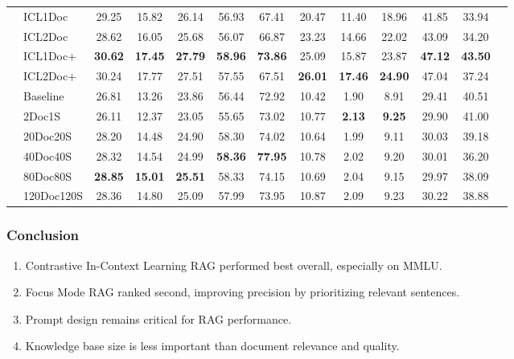 \documentclass[12pt, a4paper, oneside]{report}
\begin{document}
\begin{table}[H]
\begin{tabular}{llccccccccccc}
  & ICL1Doc  & 29.25 & 15.82 & 26.14 & 56.93 & 67.41 & 20.47 & 11.40 & 18.96 & 41.85 & 33.94 \\
  & ICL2Doc  & 28.62 & 16.05 & 25.68 & 56.07 & 66.87 & 23.23 & 14.66 & 22.02 & 43.09 & 34.20 \\
  & ICL1Doc+ & \textbf{30.62} & \textbf{17.45} & \textbf{27.79} & \textbf{58.96} & \textbf{73.86} & 25.09 & 15.87 & 23.87 & \textbf{47.12} & \textbf{43.50} \\
  & ICL2Doc+ & 30.24 & 17.77 & 27.51 & 57.55 & 67.51 & \textbf{26.01} & \textbf{17.46} & \textbf{24.90} & 47.04 & 37.24 \\
\midrule
{}
  & Baseline   & 26.81 & 13.26 & 23.86 & 56.44 & 72.92 & 10.42 & 1.90 & 8.91 & 29.41 & 40.51 \\
  & 2Doc1S     & 26.11 & 12.37 & 23.05 & 55.65 & 73.02 & 10.77 & \textbf{2.13} & \textbf{9.25} & 29.90 & 41.00 \\
  & 20Doc20S   & 28.20 & 14.48 & 24.90 & 58.30 & 74.02 & 10.64 & 1.99 & 9.11 & 30.03 & 39.18 \\
  & 40Doc40S   & 28.32 & 14.54 & 24.99 & \textbf{58.36} & \textbf{77.95} & 10.78 & 2.02 & 9.20 & 30.01 & 36.20 \\
  & 80Doc80S   & \textbf{28.85} & \textbf{15.01} & \textbf{25.51} & 58.33 & 74.15 & 10.69 & 2.04 & 9.15 & 29.97 & 38.09 \\
  & 120Doc120S & 28.36 & 14.80 & 25.09 & 57.99 & 73.95 & 10.87 & 2.09 & 9.23 & 30.22 & 38.88 \\
\bottomrule
\end{tabular}
\end{table}

\subsubsection{Conclusion}

\begin{enumerate}
  \item Contrastive In-Context Learning RAG performed best overall, especially on MMLU.
  \item Focus Mode RAG ranked second, improving precision by prioritizing relevant sentences.
  \item Prompt design remains critical for RAG performance.
  \item Knowledge base size is less important than document relevance and quality.
\end{enumerate}
\end{document}
